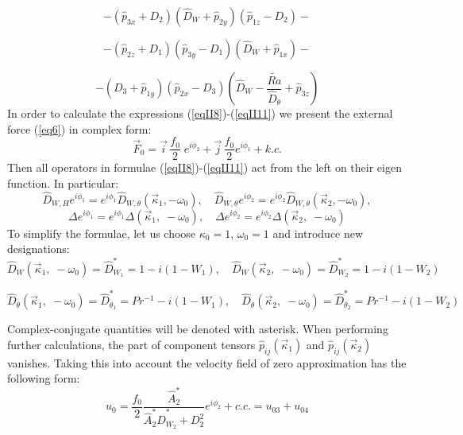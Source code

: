 \documentclass [12pt]{article}
\begin{document}
\[-\left(\widehat{p}_{3x}
+D_{2} \right)\left(\widehat{D}_{W} +\widehat{p}_{2y} \right)\left(\widehat{p}_{1z} -D_{2}
\right)-\]

\[-\left(\widehat{p}_{2z} +D_{1} \right)\left(\widehat{p}_{3y} -D_{1}
\right)\left(\widehat{D}_{W}  +\widehat{p}_{1x} \right)-\]

\begin{equation}\label{eqII11}
    -\left(D_{3} +\widehat{p}_{1y}
\right)\left(\widehat{p}_{2x} -D_{3} \right)\left(\widehat{D}_{W} -\frac{\widetilde{Ra}
 }{\widehat{D}_{\theta} } +\widehat{p}_{3z} \right)
\end{equation}
In order to calculate the expressions (\ref{eqII8})-(\ref{eqII11}) we present the external force  (\ref{eq6})   in complex form:
\begin{equation} \label{eqII12}
 \vec{F}_{0} = \vec{i} \, \frac{f_{0} }{2} \; e^{i
\phi _{2} } +\vec{j} \, \frac{f_{0} }{2} e^{i\phi _{1} } + k.c.
\end{equation}
Then all operators in formulae (\ref{eqII8})-(\ref{eqII11}) act from the left on their eigen function. In particular:
\[\widehat{D}_{W,H} e^{i\phi _{1} } =e^{i\phi
_{1} } \widehat{D}_{W,\theta} \left(\vec{\kappa }_{1} , -\omega _{0} \right), \quad \widehat{D}_{W,\theta}
e^{i\phi _{2} } =e^{i\phi _{2} } \widehat{D}_{W,\theta} \left(\vec{\kappa }_{2} ,- \omega _{0} \right), \]
\begin{equation} \label{eqII13}
 \Delta e^{i\phi _{1} } =e^{i\phi _{1} } \Delta \left(\vec{\kappa
}_{1} ,\; -\omega _{0} \right),\quad \Delta e^{i\phi _{2} } =e^{i\phi _{2} } \Delta \left(
\vec{\kappa }_{2} ,\; -\omega _{0} \right)
\end{equation}
To simplify the formulae, let us choose    $\kappa _{0} =1$, $\omega _{0} =1$    and introduce new designations:
\begin{equation}\label{eqII14}
\widehat{D}_{W} \left(\vec{\kappa }_{1} ,\; -\omega _{0} \right)=
\widehat{D}_{W_{1} }^{*} =1-i\left(1-W_{1} \right),\quad \widehat{D}_{W} \left(\vec{\kappa
}_{2} ,\; -\omega _{0} \right)=\widehat{D}_{W_{2} }^{*} =1-i\left(1-W_{2} \right) \end{equation}

\[\widehat{D}_{\theta}
\left(\vec{\kappa }_{1} ,\; -\omega _{0} \right)=\widehat{D}_{\theta_{1} }^{*} =Pr^{-1}
-i\left(1-W_{1} \right),\quad \widehat{D}_{\theta} \left(\vec{\kappa }_{2} ,\; -\omega _{0}
\right)=\widehat{D}_{\theta_{2} }^{*} =Pr^{-1} -i\left(1-W_{2} \right)\]

Complex-conjugate quantities  will be denoted with asterisk. When performing further calculations, the part of component tensors   $\widehat{p}_{ij} \left(\vec{\kappa }_{1} \right)$ and  $\widehat{p}_{ij} \left(\vec{\kappa }_{2} \right)$ vanishes. Taking this into account the velocity field of  zero approximation has the following form:
\begin{equation}\label{eqII15}
 u_{0} =\frac{f_{0} }{2} \frac{\widehat A_{2}^{*} }{\widehat A_{2}^{*}\widehat{D}_{W_{2} }^{*} +D_{2}^{2} }
e^{i\phi _{2} } +c.c.=u_{03} +u_{04}
\end{equation}
\end{document}
